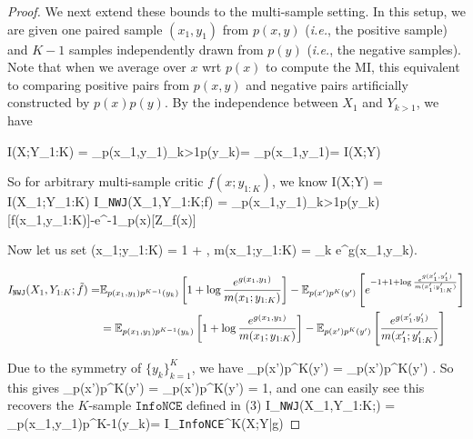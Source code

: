 \documentclass{article}
\theoremstyle{plain}
\theoremstyle{definition}
\theoremstyle{remark}
\newcommand{\infonce}{\texttt{InfoNCE}}
\newcommand{\NWJ}{\texttt{NWJ}}
\begin{document}
\begin{proof}
			
			
			We next extend these bounds to the multi-sample setting. In this setup, we are given one paired sample $(x_1, y_1)$ from $p(x,y)$ ({\it i.e.}, the positive sample) and $K-1$ samples independently drawn from $p(y)$ ({\it i.e.}, the negative samples). Note that when we average over $x$ wrt $p(x)$ to compute the MI, this equivalent to comparing positive pairs from $p(x,y)$ and negative pairs artificially constructed by $p(x)p(y)$. By the independence between $X_1$ and $Y_{k>1}$, we have 
			
			\beq
			I(X;Y_{1:K}) = \EE_{p(x_1,y_1)\prod_{k>1}p(y_k)} = \EE_{p(x_1,y_1)} = I(X;Y)
			\eeq
			
			So for arbitrary multi-sample critic $f(x; y_{1:K})$, we know 
			\beq
			I(X;Y) = I(X_1;Y_{1:K}) \geq I_{\NWJ}(X_1,Y_{1:K};f) = \EE_{p(x_1,y_1)\prod_{k>1}p(y_k)}[f(x_1,y_{1:K})]-e^{-1}\EE_{p(x)}[Z_f(x)]
			\eeq
			
			Now let us set 
			\beq
			(x_1;y_{1:K}) = 1 + \log {}, \quad m(x_1;y_{1:K}) =  \sum_k e^{g(x_1,y_k)}. 
			\label{eq:fg}
			\eeq
			
			\begin{equation*}
				\begin{split}
					I_{\NWJ}(X_1,Y_{1:K};\tilde{f}) = & \EE_{p(x_1,y_1)p^{K-1}(y_k)}\left[ 1+ \log \frac{e^{g(x_1, y_1)}}{m(x_1;y_{1:K})} \right] - \EE_{p(x')p^K(y')} \left[e^{-1+1 +\log \frac{e^{g(x_1', y_1')}}{m(x_1'; y_{1:K}' )} }\right] \\
					& = \EE_{p(x_1,y_1)p^{K-1}(y_k)}\left[ 1+ \log \frac{e^{g(x_1, y_1)}}{m(x_1;y_{1:K})} \right] - \EE_{p(x')p^K(y')} \left[ \frac{e^{g(x_1', y_1')}}{m(x_1'; y_{1:K}' )} \right] 
				\end{split}
			\end{equation*}
			
			Due to the symmetry of $\{y_k\}_{k=1}^K$, we have 
			\beq
			\EE_{p(x')p^K(y')}   = \EE_{p(x')p^K(y')} .
			\eeq
			So this gives
			\beq
			\EE_{p(x')p^K(y')}  = \EE_{p(x')p^K(y')}   = 1,
			\eeq
			and one can easily see this recovers the $K$-sample $\infonce$ defined in (3)
			\beq
			I_{\NWJ}(X_1,Y_{1:K};) = \EE_{p(x_1,y_1)p^{K-1}(y_k)} = I_{\infonce}^K(X;Y|g)
			\eeq
			

\end{proof}
\end{document}
